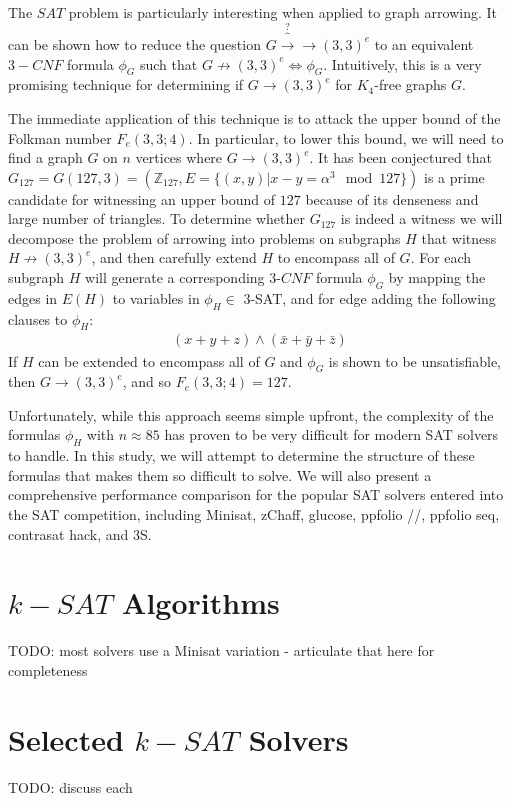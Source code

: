 \documentclass[paper=a4, fontsize=11pt]{scrartcl} %
\begin{document}
The $SAT$ problem is particularly interesting when applied to graph arrowing. It can be shown
how to reduce the question $G \overbrace{\to}^\text{?} \to (3,3)^e$ to an equivalent $3-CNF$ formula
$\phi_G$ such that $G \not \to (3,3)^e \Leftrightarrow \phi_G$. Intuitively, this is a very promising
technique for determining if $G \to (3,3)^e$ for $K_4$-free graphs $G$.

The immediate application of this technique is to attack the upper bound of the Folkman number
$F_e(3,3;4)$. In particular, to lower this bound, we will need to find a 
graph $G$ on $n$ vertices where $G \to (3,3)^e$. It has been conjectured that 
$G_{127} = G(127,3) = (\mathbb{Z}_{127}, E = \{(x,y) | x - y = \alpha^3 \mod 127\})$ is a
prime candidate for witnessing an upper bound of $127$ because of its denseness and large number
of triangles. To determine whether $G_{127}$ is indeed a witness we will decompose 
the problem of arrowing into problems on subgraphs $H$ that witness $H \not \to (3,3)^e$, 
and then carefully extend $H$ to encompass all of $G$. For each subgraph $H$ will generate
a corresponding $3$-$CNF$ formula $\phi_G$ by mapping the edges in $E(H)$ to variables 
in $\phi_H \in$ 3-SAT, and for edge adding the following clauses to $\phi_H$:
\begin{align*}
(x + y + z) \wedge (\bar{x} + \bar{y} + \bar{z})
\end{align*}
If $H$ can be extended to encompass all of $G$ and $\phi_G$ is 
shown to be unsatisfiable, then $G \to (3,3)^e$, and so $F_e(3,3;4) = 127$.

Unfortunately, while this approach seems simple upfront, the complexity of the formulas
$\phi_H$ with $n \approx 85$ has proven to be very difficult for modern SAT solvers
to handle. In this study, we will attempt to determine the structure of these formulas
that makes them so difficult to solve. We will also present a comprehensive performance 
comparison for the popular SAT solvers entered into the SAT competition, including
Minisat, zChaff, glucose, ppfolio //, ppfolio seq, contrasat hack, and 3S.

\section{$k-SAT$ Algorithms}
{\color{red} TODO}: most solvers use a Minisat variation - articulate that here for completeness

\section{Selected $k-SAT$ Solvers}
{\color{red} TODO}: discuss each 
\end{document}
